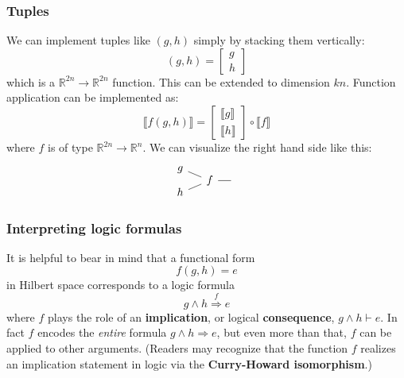 \subsubsection*{Tuples}

We can implement tuples like $(g, h)$ simply by stacking them vertically:
\begin{equation}
(g, h) = \begin{bmatrix}
g \\
h
\end{bmatrix}
\end{equation}
which is a $\mathbb{R}^{2n} \rightarrow \mathbb{R}^{2n}$ function.  This can be extended to dimension $kn$.  Function application can be implemented as:
\begin{equation}
\llbracket f(g, h) \rrbracket =
\begin{bmatrix}
\llbracket g \rrbracket \\
\llbracket h \rrbracket
\end{bmatrix} \circ \llbracket f \rrbracket
\end{equation}
where $f$ is of type $\mathbb{R}^{2n} \rightarrow \mathbb{R}^n$.  We can visualize the right hand side like this:
\begin{equation}
\begin{tikzcd}[column sep=small, row sep=-0.5em]
g \arrow[-, dr] & & \\
& f \arrow[-, r] & {} \\
h \arrow[-, ur] & &
\end{tikzcd} 
\end{equation}

\subsubsection*{Interpreting logic formulas}

It is helpful to bear in mind that a functional form
\begin{equation}
f(g, h) = e
\end{equation}
in Hilbert space corresponds to a logic formula
\begin{equation}
g \wedge h \stackrel{f}{\Longrightarrow} e
\end{equation}
where $f$ plays the role of an \textbf{implication}, or logical \textbf{consequence}, $g \wedge h \vdash e$.  In fact $f$ encodes the \textit{entire} formula $g \wedge h \Rightarrow e$, but even more than that, $f$ can be applied to other arguments.  (Readers may recognize that the function $f$ realizes an implication statement in logic via the \textbf{Curry-Howard isomorphism}.)

